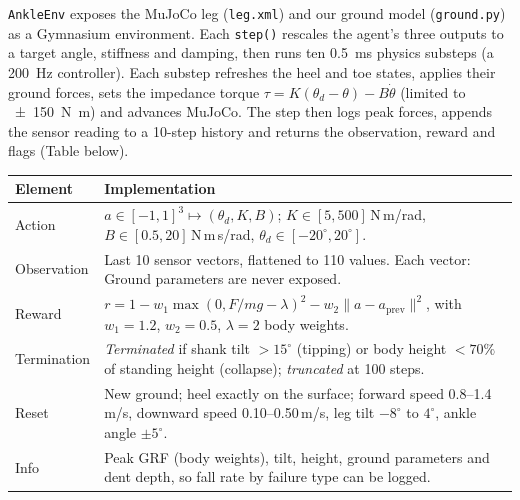 \documentclass[10pt,a4paper]{article}
\begin{document}
\texttt{AnkleEnv} exposes the MuJoCo leg (\texttt{leg.xml}) and our ground model (\texttt{ground.py}) as a Gymnasium environment. Each \texttt{step()} rescales the agent's three outputs to a target angle, stiffness and damping, then runs ten \SI{0.5}{ms} physics substeps (a \SI{200}{Hz} controller). Each substep refreshes the heel and toe states, applies their ground forces, sets the impedance torque $\tau = K(\theta_d-\theta)-B\dot{\theta}$ (limited to \SI{\pm150}{N.m}) and advances MuJoCo. The step then logs peak forces, appends the sensor reading to a 10-step history and returns the observation, reward and flags (Table below).

\begin{center}\small
\begin{tabular}{@{}l p{5.6in}@{}}
\toprule
Element & Implementation \\
\midrule
Action & $a\in[-1,1]^3\mapsto(\theta_d,K,B)$; $K\in[5,500]$\,N\,m/rad, $B\in[0.5,20]$\,N\,m\,s/rad, $\theta_d\in[-20^\circ,20^\circ]$. \\
Observation & Last 10 sensor vectors, flattened to 110 values. Each vector: Ground parameters are never exposed. \\
Reward & $r=1-w_1\max(0,F/mg-\lambda)^2-w_2\lVert a-a_{\mathrm{prev}}\rVert^2$, with $w_1=1.2$, $w_2=0.5$, $\lambda=2$ body weights. \\
Termination & \emph{Terminated} if shank tilt $>15^\circ$ (tipping) or body height $<70\%$ of standing height (collapse); \emph{truncated} at 100 steps. \\
Reset & New ground; heel exactly on the surface; forward speed 0.8--1.4\,m/s, downward speed 0.10--0.50\,m/s, leg tilt $-8^\circ$ to $4^\circ$, ankle angle $\pm5^\circ$. \\
Info & Peak GRF (body weights), tilt, height, ground parameters and dent depth, so fall rate by failure type can be logged. \\
\bottomrule
\end{tabular}
\end{center}

\end{document}
